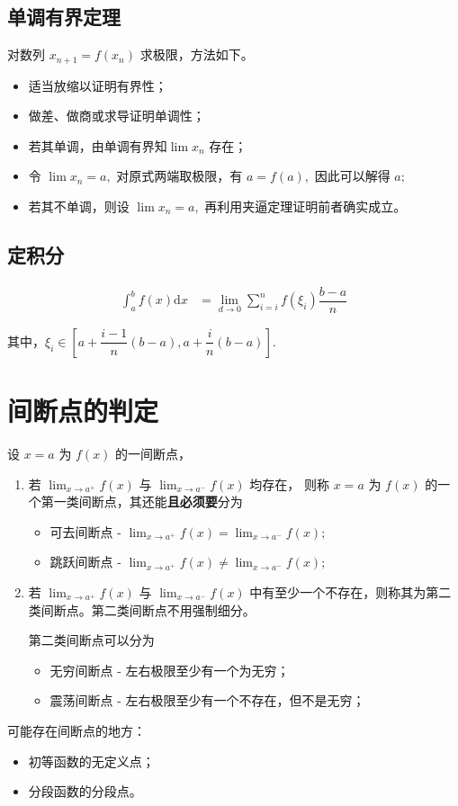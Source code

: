 \subsection{单调有界定理}

对数列 $ x_{n+1} = f(x_n) $ 求极限，方法如下。
\begin{itemize}
    \item 适当放缩以证明有界性；
    \item 做差、做商或求导证明单调性；
    \item 若其单调，由单调有界知$ \lim x_n $ 存在；
    \item 令 $ \lim x_n = a, $ 对原式两端取极限，有 $ a = f(a), $ 因此可以解得 $ a; $ 
    \item 若其不单调，则设 $ \lim x_n = a, $ 再利用夹逼定理证明前者确实成立。
\end{itemize}

\subsection{定积分}

\begin{equation*}
    \begin{aligned}
        \int_a^b f(x)\mathrm{d}x&={\displaystyle\lim_{d\rightarrow 0}}\sum_{i=i}^nf(\xi_i)\dfrac{b-a}{n}
    \end{aligned}
\end{equation*}

其中，$ \xi_i\in\left[a+\dfrac{i-1}{n}(b-a),a+\dfrac{i}{n}(b-a)\right]. $ 

\section{间断点的判定}

设 $ x=a $ 为 $ f(x) $ 的一间断点，
\begin{enumerate}
    \item 若 $ {\displaystyle\lim_{x\rightarrow a^+}}f(x) $ 与 $ {\displaystyle\lim_{x\rightarrow a^-}}f(x) $ 均存在，
    则称 $ x=a $ 为 $ f(x) $ 的一个第一类间断点，其还能\textbf{且必须要}分为\begin{itemize}
        \item 可去间断点 - 
        $ {\displaystyle\lim_{x\rightarrow a^+}}f(x)={\displaystyle\lim_{x\rightarrow a^-}}f(x); $
        \item 跳跃间断点 - 
        $ {\displaystyle\lim_{x\rightarrow a^+}}f(x)\neq{\displaystyle\lim_{x\rightarrow a^-}}f(x); $
    \end{itemize}
    \item 若 $ {\displaystyle\lim_{x\rightarrow a^+}}f(x) $ 与 $ {\displaystyle\lim_{x\rightarrow a^-}}f(x) $ 
    中有至少一个不存在，则称其为第二类间断点。第二类间断点不用强制细分。

    第二类间断点可以分为
    \begin{itemize}
        \item 无穷间断点 - 左右极限至少有一个为无穷；
        \item 震荡间断点 - 左右极限至少有一个不存在，但不是无穷；
    \end{itemize}
\end{enumerate}

可能存在间断点的地方：
\begin{itemize}
    \item 初等函数的无定义点；
    \item 分段函数的分段点。
\end{itemize}


